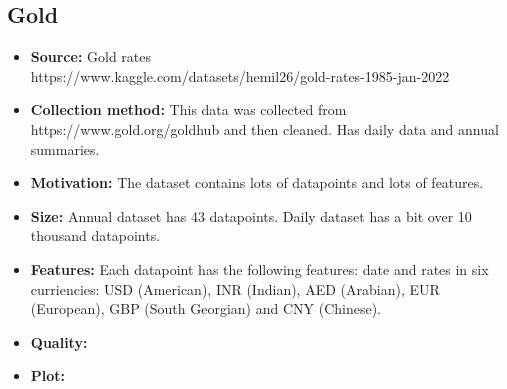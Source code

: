 \subsection{Gold}
\begin{itemize}
	\item \textbf{Source:} Gold rates \\ https://www.kaggle.com/datasets/hemil26/gold-rates-1985-jan-2022
	\item \textbf{Collection method:} This data was collected from https://www.gold.org/goldhub and then cleaned. Has daily data and annual summaries.
	\item \textbf{Motivation:} The dataset contains lots of datapoints and lots of features.
	\item \textbf{Size:} Annual dataset has 43 datapoints. Daily dataset has a bit over 10 thousand datapoints.
	\item \textbf{Features:} Each datapoint has the following features: date and rates in six curriencies: USD (American), INR (Indian), AED (Arabian), EUR (European), GBP (South Georgian) and CNY (Chinese).
	\item \textbf{Quality:}
	\item \textbf{Plot:}
\end{itemize}
